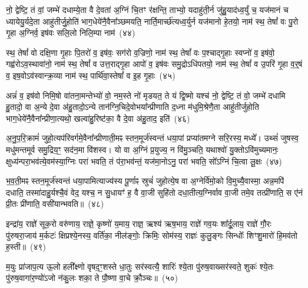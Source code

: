नो॒ द्वेष्टि॒ तं वां॒ जम्भे॑ दधाम्ये॒ता वै दे॒वता॑ अ॒ग्निं चि॒तꣳ र॑क्षन्ति॒ ताभ्यो॒ यदाहु॑ती॒र्न जु॑हु॒याद॑ध्व॒र्युं च॒ यज॑मानं च ध्यायेयु॒र्यदे॒ता आहु॑तीर्जु॒होति॑ भाग॒धेये॑नै॒वैना᳚ञ्छमयति॒ नार्ति॒मार्च्छ॑त्यध्व॒र्युर्न यज॑मानो हे॒तयो॒ नाम॑ स्थ॒ तेषां᳚ वः पु॒रो गृ॒हा अ॒ग्निर्व॒ इष॑वः सलि॒लो निलि॒म्पा नाम॑~(४४)

स्थ॒ तेषां᳚ वो दक्षि॒णा गृ॒हाः पि॒तरो॑ व॒ इष॑वः॒ सग॑रो व॒ज्रिणो॒ नाम॑ स्थ॒ तेषां᳚ वः प॒श्चाद्गृ॒हाः स्वप्नो॑ व॒ इष॑वो॒ गह्व॑रो\-ऽव॒स्थावा॑नो॒ नाम॑ स्थ॒ तेषां᳚ व उत्त॒राद्गृ॒हा आपो॑ व॒ इष॑वः समु॒द्रो\-ऽधि॑पतयो॒ नाम॑ स्थ॒ तेषां᳚ व उ॒परि॑ गृ॒हा व॒र्॒\mbox{}षं व॒ इष॒वो\-ऽव॑स्वान्क्र॒व्या नाम॑ स्थ॒ पार्थि॑वा॒स्तेषां᳚ व इ॒ह गृ॒हाः~(४५)

अन्नं॑ व॒ इष॑वो निमि॒षो वा॑तना॒मन्तेभ्यो॑ वो॒ नम॒स्ते नो॑ मृडयत॒ ते यं द्वि॒ष्मो यश्च॑ नो॒ द्वेष्टि॒ तं वो॒ जम्भे॑ दधामि हु॒तादो॒ वा अ॒न्ये दे॒वा अ॑हु॒तादो॒\-ऽन्ये तान॑ग्नि॒चिदे॒वोभया᳚न्प्रीणाति द॒ध्ना म॑धुमि॒श्रेणै॒ता आहु॑तीर्जुहोति भाग॒धेये॑नै॒वैना᳚न्प्रीणा॒त्यथो॒ खल्वा॑हु॒रिष्ट॑का॒ वै दे॒वा अ॑हु॒ताद॒ इति॑~(४६)

अ॒नु॒प॒रि॒क्रामं॑ जुहो॒त्यप॑रिवर्गमे॒वैना᳚न्प्रीणाती॒मꣴ स्तन॒मूर्ज॑स्वन्तं धया॒पां प्रप्या॑तमग्ने सरि॒रस्य॒ मध्ये᳚। उथ्सं॑ जुषस्व॒ मधु॑मन्तमूर्व समु॒द्रिय॒ꣳ॒ सद॑न॒मा वि॑शस्व। यो वा अ॒ग्निं प्र॒युज्य॒ न वि॑मु॒ञ्चति॒ यथाश्वो॑ यु॒क्तो\-ऽवि॑मुच्यमानः॒ क्षुध्य॑न्परा॒भव॑त्ये॒वम॑स्या॒ग्निः परा॑ भवति॒ तं प॑रा॒भव॑न्तं॒ यज॑मा॒नो\-ऽनु॒ परा॑ भवति॒ सो᳚\-ऽग्निं चि॒त्वा लू॒क्षः~(४७)

भ॒व॒ती॒मꣴ स्तन॒मूर्ज॑स्वन्तं धया॒पामित्याज्य॑स्य पू॒र्णाꣴ स्रुचं॑ जुहोत्ये॒ष वा अ॒ग्नेर्वि॑मो॒को वि॒मुच्यै॒वास्मा॒ अन्न॒मपि॑ दधाति॒ तस्मा॑दाहु॒र्यश्चै॒वं वेद॒ यश्च॒ न सु॒धायꣳ॑ ह॒ वै वा॒जी सुहि॑तो दधा॒तीत्य॒ग्निर्वाव वा॒जी तमे॒व तत्प्री॑णाति॒ स ए॑नं प्री॒तः प्री॑णाति॒ वसी॑यान्भवति॥~(४८)

{\anuvakamend[{प्र॒तीची॒ दिक्तस्या᳚स्ते द्वि॒ष्मो यश्च॑ निलि॒म्पा नामे॒ह गृ॒हा इति॑ लू॒क्षो वसी॑यान्भवति}]}%

इन्द्रा॑य॒ राज्ञे॑ सूक॒रो वरु॑णाय॒ राज्ञे॒ कृष्णो॑ य॒माय॒ राज्ञ॒ ऋश्य॑ ऋष॒भाय॒ राज्ञे॑ गव॒यः शा᳚र्दू॒लाय॒ राज्ञे॑ गौ॒रः पु॑रुषरा॒जाय॑ म॒र्कटः॑ क्षिप्रश्ये॒नस्य॒ वर्ति॑का॒ नील॑ङ्गोः॒ क्रिमिः॒ सोम॑स्य॒ राज्ञः॑ कुलु॒ङ्गः सिन्धोः᳚ शिꣳशु॒मारो॑ हि॒मव॑तो ह॒स्ती॥~(४९)

{\anuvakamend[{इन्द्रा॑या॒ष्टाविꣳ॑शतिः}]}%

म॒युः प्रा॑जाप॒त्य ऊ॒लो हली᳚क्ष्णो वृषद॒ꣳ॒शस्ते धा॒तुः सर॑स्वत्यै॒ शारिः॑ श्ये॒ता पु॑रुष॒वाख्सर॑स्वते॒ शुकः॑ श्ये॒तः पु॑रुष॒वागा॑र॒ण्यो॑\-ऽजो न॑कु॒लः शका॒ ते पौ॒ष्णा वा॒चे क्रौ॒ञ्चः॥~(५०)

